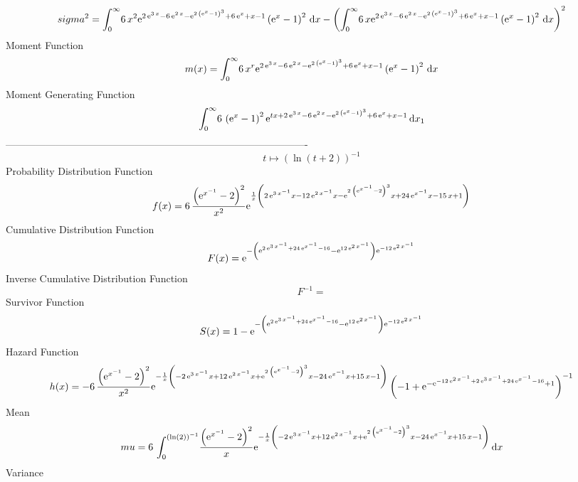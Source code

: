 \documentclass[12pt]{article}
\begin{document}
 $$ sigma^2 = \int_{0}^{\infty }\!6\,{x}^{2}{{\rm e}^{2\,{{\rm e}^{3\,x}}-6\,{
{\rm e}^{2\,x}}-{{\rm e}^{2\, \left( {{\rm e}^{x}}-1 \right) ^{3}}}+6
\,{{\rm e}^{x}}+x-1}} \left( {{\rm e}^{x}}-1 \right) ^{2}\,{\rm d}x-
 \left( \int_{0}^{\infty }\!6\,x{{\rm e}^{2\,{{\rm e}^{3\,x}}-6\,{
{\rm e}^{2\,x}}-{{\rm e}^{2\, \left( {{\rm e}^{x}}-1 \right) ^{3}}}+6
\,{{\rm e}^{x}}+x-1}} \left( {{\rm e}^{x}}-1 \right) ^{2}\,{\rm d}x
 \right) ^{2}
$$Moment Function 
 $$ m(x) = \int_{0}^{\infty }\!6\,{x}^{r}{{\rm e}^{2\,{{\rm e}^{3\,x}}-6\,{
{\rm e}^{2\,x}}-{{\rm e}^{2\, \left( {{\rm e}^{x}}-1 \right) ^{3}}}+6
\,{{\rm e}^{x}}+x-1}} \left( {{\rm e}^{x}}-1 \right) ^{2}\,{\rm d}x
$$ Moment Generating Function 
 $$\int_{0}^{\infty }\!6\, \left( {{\rm e}^{x}}-1 \right) ^{2}{{\rm e}^{t
x+2\,{{\rm e}^{3\,x}}-6\,{{\rm e}^{2\,x}}-{{\rm e}^{2\, \left( {
{\rm e}^{x}}-1 \right) ^{3}}}+6\,{{\rm e}^{x}}+x-1}}\,{\rm d}x_{{1}}
$$-------------------------------------------------------------------------------------------  \\$$t\mapsto  \left( \ln  \left( t+2 \right)  \right) ^{-1}
$$Probability Distribution Function 
$$  f(x)=6\,{\frac { \left( {{\rm e}^{{x}^{-1}}}-2 \right) ^{2}}{{x}^{2}}{
{\rm e}^{{\frac {1}{x} \left( 2\,{{\rm e}^{3\,{x}^{-1}}}x-12\,{{\rm e}
^{2\,{x}^{-1}}}x-{{\rm e}^{2\, \left( {{\rm e}^{{x}^{-1}}}-2 \right) ^
{3}}}x+24\,{{\rm e}^{{x}^{-1}}}x-15\,x+1 \right) }}}}
$$Cumulative Distribution Function  
 $$F(x)={{\rm e}^{- \left( {{\rm e}^{2\,{{\rm e}^{3\,{x}^{-1}}}+24\,{{\rm e}^{
{x}^{-1}}}-16}}-{{\rm e}^{12\,{{\rm e}^{2\,{x}^{-1}}}}} \right) {
{\rm e}^{-12\,{{\rm e}^{2\,{x}^{-1}}}}}}}
$$ Inverse Cumulative Distribution Function 
  $$F^{-1} =
$$Survivor Function 
 $$ S(x)=1-{{\rm e}^{- \left( {{\rm e}^{2\,{{\rm e}^{3\,{x}^{-1}}}+24\,{{\rm e}
^{{x}^{-1}}}-16}}-{{\rm e}^{12\,{{\rm e}^{2\,{x}^{-1}}}}} \right) {
{\rm e}^{-12\,{{\rm e}^{2\,{x}^{-1}}}}}}}
$$ Hazard Function 
 $$ h(x)=-6\,{\frac { \left( {{\rm e}^{{x}^{-1}}}-2 \right) ^{2}}{{x}^{2}}{
{\rm e}^{-{\frac {1}{x} \left( -2\,{{\rm e}^{3\,{x}^{-1}}}x+12\,{
{\rm e}^{2\,{x}^{-1}}}x+{{\rm e}^{2\, \left( {{\rm e}^{{x}^{-1}}}-2
 \right) ^{3}}}x-24\,{{\rm e}^{{x}^{-1}}}x+15\,x-1 \right) }}} \left( 
-1+{{\rm e}^{-{{\rm e}^{-12\,{{\rm e}^{2\,{x}^{-1}}}+2\,{{\rm e}^{3\,{
x}^{-1}}}+24\,{{\rm e}^{{x}^{-1}}}-16}}+1}} \right) ^{-1}}
$$Mean 
 $$ mu=6\,\int_{0}^{ \left( \ln  \left( 2 \right)  \right) ^{-1}}\!{\frac {
 \left( {{\rm e}^{{x}^{-1}}}-2 \right) ^{2}}{x}{{\rm e}^{-{\frac {1}{x
} \left( -2\,{{\rm e}^{3\,{x}^{-1}}}x+12\,{{\rm e}^{2\,{x}^{-1}}}x+{
{\rm e}^{2\, \left( {{\rm e}^{{x}^{-1}}}-2 \right) ^{3}}}x-24\,{
{\rm e}^{{x}^{-1}}}x+15\,x-1 \right) }}}}\,{\rm d}x
$$ Variance 
\end{document}
